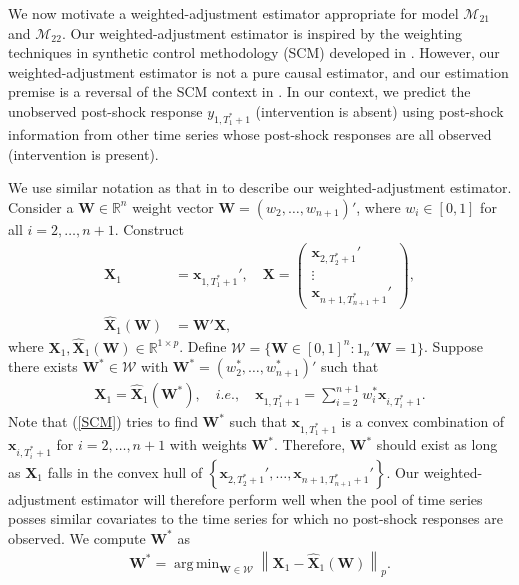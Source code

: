 \documentclass[11pt,3p,review,authoryear]{elsarticle}
\newcommand{\R}{\mathbb{R}}
\def\mbf#1{\mathbf{#1}} %
\def\mc#1{\mathcal{#1}} %
\DeclareMathOperator*{\argmin}{arg\,min} %
\newcommand{\norm}[1]{\left\lVert#1\right\rVert} %
\theoremstyle{definition}
\begin{document}
We now motivate a weighted-adjustment estimator appropriate for model $\mc{M}_{21}$ and $\mc{M}_{22}$. Our weighted-adjustment estimator is inspired by the weighting techniques in synthetic control methodology (SCM) developed in \cite{abadie2010synthetic}. However, our weighted-adjustment estimator is not a pure causal estimator, and our estimation premise is a reversal of the SCM context in \cite{abadie2010synthetic}. In our context, we predict the unobserved post-shock response $y_{1,T_1^*+1}$ (intervention is absent) using post-shock information from other time series whose post-shock responses are all observed (intervention is present).


We use similar notation as that in \cite{abadie2010synthetic} to describe our weighted-adjustment estimator. Consider a $\mbf{W} \in \R^n$ weight vector $\mbf{W}=(w_2, \ldots, w_{n+1})'$, where $w_i\in [0,1]$ for all $i = 2, \ldots, n+1$. Construct
\begin{align*}
 \mbf{X}_1 &= \mbf{x}_{1, T_1^*+1}',
  \quad  
  \mbf{X} = \begin{pmatrix}
    \mbf{x}_{2, T_2^*+1}' \\
    \vdots \\
    \mbf{x}_{n+1, T_{n+1}^*+1}'
  \end{pmatrix}, \\ 
  \hat{\mbf{X}}_1(\mbf{W}) 
   & = \mbf{W}'\mbf{X},
\end{align*}
where $\mbf{X}_1,\hat{\mbf{X}}_1(\mbf{W}) \in \R^{1 \times p}$. Define $\mc{W}=\{\mbf{W}\in [0,1]^n \colon 1_n'\mbf{W} = 1 \}$. 
Suppose there exists $\mbf{W}^*\in \mc{W}$ with 
$\mbf{W}^*=(w_2^*, \ldots, w_{n+1}^*)'$ such that
\begin{align}
 \mbf{X}_1=\hat{\mbf{X}}_1(\mbf{W}^*),  \quad i.e., \quad \mbf{x}_{1, T_1^*+1} = \sum_{i=2}^{n+1} w_i^*\mbf{x}_{i, T_i^*+1}.\label{SCM}
\end{align}
Note that (\ref{SCM}) tries to find $\mbf{W}^*$ such that $\mbf{x}_{1, T_1^*+1}$ is a convex combination of $\mbf{x}_{i, T_i^*+1}$ for $i = 2, \ldots, n+1$ with weights $\mbf{W}^*$. Therefore, $\mbf{W}^*$ should exist as long as $\mbf{X}_1$ falls in the convex hull of 
$
   \left\{ \mbf{x}_{2, T_2^*+1}', \ldots, \mbf{x}_{n+1, T_{n+1}^*+1}' \right\}.
$
Our weighted-adjustment estimator will therefore perform well when the pool of time series posses similar covariates to the time series for which no post-shock responses are observed. We compute $\mbf{W}^*$ as
\begin{align}
  \mbf{W}^* = \argmin_{\mbf{W}\in \mc{W}} \norm{\mbf{X}_1-\hat{\mbf{X}}_1(\mbf{W})}_{p}. 
  \label{W}
\end{align}
\end{document}
